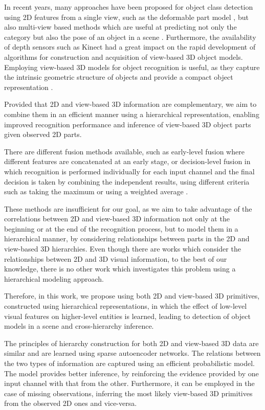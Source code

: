 \documentclass[runningheads]{llncs}
\begin{document}
In recent years, many approaches have been proposed for object class detection using 2D features from a single view, such as the deformable part model \cite{Felzenswalb2010}, but also multi-view based methods which are useful at predicting not only the category but also the pose of an object in a scene \cite{Teney2014}. Furthermore, the availability of depth sensors such as Kinect had a great impact on the rapid development of algorithms for construction and acquisition of view-based 3D object models. Employing view-based 3D models for object recognition is useful, as they capture the intrinsic geometric structure of objects and provide a compact object representation \cite{Liebelt2010}. 

Provided that 2D and view-based 3D information are complementary, we aim to combine them in an efficient manner using a hierarchical representation, enabling improved recognition performance and inference of view-based 3D object parts given observed 2D parts. 

There are different fusion methods available, such as early-level fusion where different features are concatenated at an early stage, or decision-level fusion in which recognition is performed individually for each input channel and the final decision is taken by combining the independent results, using different criteria such as taking the maximum or using a weighted average \cite{Mahmoudi2013}.

These methods are insufficient for our goal, as we aim to take advantage of the correlations between 2D and view-based 3D information not only at the beginning or at the end of the recognition process, but to model them in a hierarchical manner, by considering relationships between parts in the 2D and view-based 3D hierarchies. Even though there are works which consider the relationships between 2D and 3D visual information, to the best of our knowledge, there is no other work which investigates this problem using a hierarchical modeling approach.

Therefore, in this work, we propose using both 2D and view-based 3D primitives, constructed using hierarchical representations, in which the effect of low-level visual features on higher-level entities is learned, leading to detection of object models in a scene and cross-hierarchy inference. 

The principles of hierarchy construction for both 2D and view-based 3D data are similar and are learned using sparse autoencoder networks. The relations between the two types of information are captured using an efficient probabilistic model. The model provides better inference, by reinforcing the evidence provided by one input channel with that from the other. Furthermore, it can be employed in the case of missing observations, inferring the most likely view-based 3D primitives from the observed 2D ones and vice-versa. 
\end{document}
